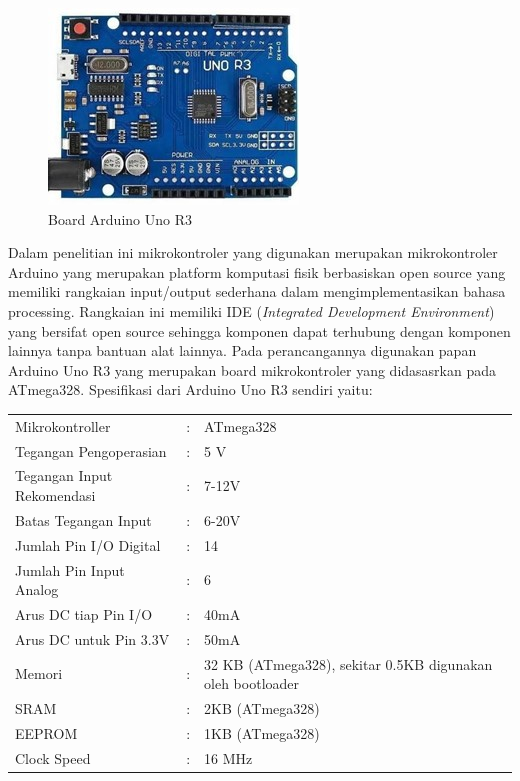 \begin{figure}[H]
    \centering
    \includegraphics{Images/ArduinoUno.jpg}
    \caption{Board Arduino Uno R3}
    \label{fig:arduino}
\end{figure}

Dalam penelitian ini mikrokontroler yang digunakan merupakan mikrokontroler Arduino yang merupakan
platform komputasi fisik berbasiskan open source yang memiliki rangkaian input/output sederhana
dalam mengimplementasikan bahasa processing. Rangkaian ini memiliki IDE (\textit{Integrated 
Development Environment}) yang bersifat open source sehingga komponen dapat terhubung dengan
komponen lainnya tanpa bantuan alat lainnya. Pada perancangannya digunakan papan Arduino Uno R3
yang merupakan board mikrokontroler yang didasasrkan pada ATmega328\cite{Sokop2016}. Spesifikasi
dari Arduino Uno R3 sendiri yaitu:
\begin{longtable}{p{6cm}p{3pt}p{6cm}}
    \hspace{20pt} Mikrokontroller &:& ATmega328\\
    \hspace{20pt} Tegangan Pengoperasian &:&5 V\\
    \hspace{20pt} Tegangan Input Rekomendasi &:& 7-12V\\
    \hspace{20pt} Batas Tegangan Input &:& 6-20V\\
    \hspace{20pt} Jumlah Pin I/O Digital &:& 14\\
    \hspace{20pt} Jumlah Pin Input Analog &:& 6\\
    \hspace{20pt} Arus DC tiap Pin I/O &:& 40mA\\
    \hspace{20pt} Arus DC untuk Pin 3.3V &:& 50mA\\
    \hspace{20pt} Memori &:& 32 KB (ATmega328), sekitar 0.5KB digunakan oleh bootloader\\
    \hspace{20pt} SRAM &:& 2KB (ATmega328)\\
    \hspace{20pt} EEPROM &:& 1KB (ATmega328)\\
    \hspace{20pt} Clock Speed &:& 16 MHz
\end{longtable}
